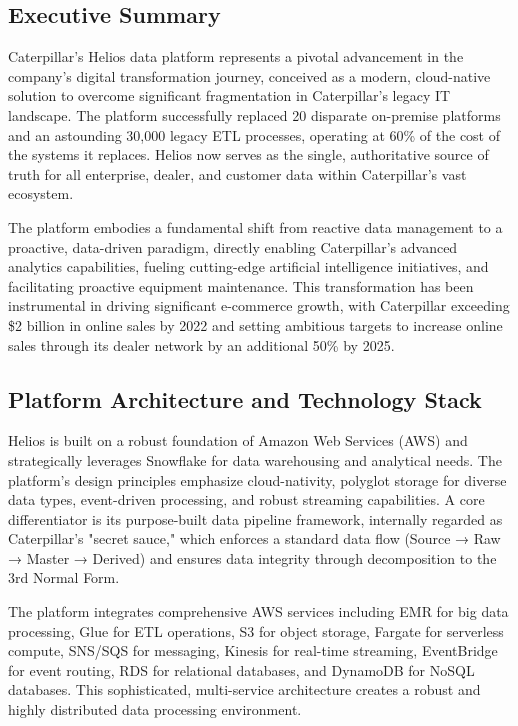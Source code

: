 \documentclass[12pt, a4paper]{article} %
\begin{document}
\subsection{Executive Summary}
Caterpillar's Helios data platform represents a pivotal advancement in the company's digital transformation journey, conceived as a modern, cloud-native solution to overcome significant fragmentation in Caterpillar's legacy IT landscape. The platform successfully replaced 20 disparate on-premise platforms and an astounding 30,000 legacy ETL processes, operating at 60\% of the cost of the systems it replaces. Helios now serves as the single, authoritative source of truth for all enterprise, dealer, and customer data within Caterpillar's vast ecosystem.

The platform embodies a fundamental shift from reactive data management to a proactive, data-driven paradigm, directly enabling Caterpillar's advanced analytics capabilities, fueling cutting-edge artificial intelligence initiatives, and facilitating proactive equipment maintenance. This transformation has been instrumental in driving significant e-commerce growth, with Caterpillar exceeding \$2 billion in online sales by 2022 and setting ambitious targets to increase online sales through its dealer network by an additional 50\% by 2025.

\subsection{Platform Architecture and Technology Stack}
Helios is built on a robust foundation of Amazon Web Services (AWS) and strategically leverages Snowflake for data warehousing and analytical needs. The platform's design principles emphasize cloud-nativity, polyglot storage for diverse data types, event-driven processing, and robust streaming capabilities. A core differentiator is its purpose-built data pipeline framework, internally regarded as Caterpillar's "secret sauce," which enforces a standard data flow (Source → Raw → Master → Derived) and ensures data integrity through decomposition to the 3rd Normal Form.

The platform integrates comprehensive AWS services including EMR for big data processing, Glue for ETL operations, S3 for object storage, Fargate for serverless compute, SNS/SQS for messaging, Kinesis for real-time streaming, EventBridge for event routing, RDS for relational databases, and DynamoDB for NoSQL databases. This sophisticated, multi-service architecture creates a robust and highly distributed data processing environment.
\end{document}
